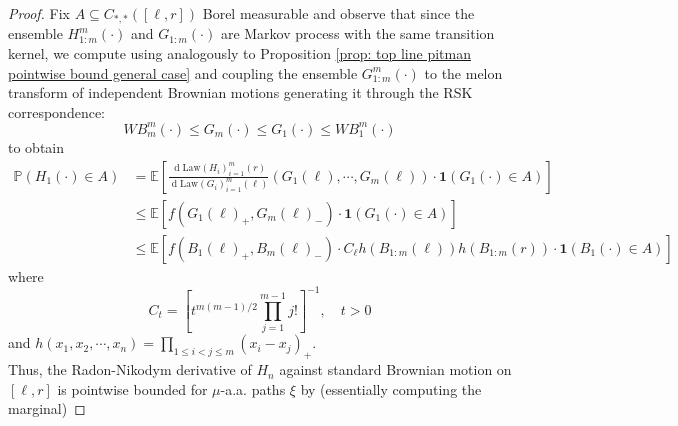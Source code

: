 \documentclass[11pt, reqno]{amsart}
\numberwithin{equation}{section}
\newcommand{\PP}{\ensuremath{\mathbb{P}}}
\newcommand{\diff}{\ensuremath{\operatorname{d}\!}}
\begin{document}
\begin{proof}
    Fix $A\subseteq C_{*,*}([\ell,r])$ Borel measurable and observe that since the ensemble $H_{1:m}^m(\cdot)$ and $G_{1:m}(\cdot)$ are Markov process with the same transition kernel, we compute using \cite[Theorem 7]{O2002representation} analogously to Proposition \ref{prop: top line pitman pointwise bound general case} and coupling the ensemble $G_{1:m}^m(\cdot)$ to the melon transform of independent Brownian motions generating it through the RSK correspondence:
    \[
    WB^m_m(\cdot) \le G_m(\cdot) \le G_1(\cdot) \le WB^m_1 (\cdot)
    \]
    to obtain
    \begin{equation*}
        \begin{array}{cc}
            \PP(H_1(\cdot)\in A) & =  \mathbb{E}\left[\frac{\diff \mathrm{Law}(H_i)_{i =1}^m(r)}{\diff\mathrm{Law}(G_i)_{i =1}^m(\ell)}(G_1(\ell), \cdots, G_m(\ell))\cdot\mathbf{1}(G_1(\cdot)\in A)\right]\\
            & \le  \mathbb{E}\left[f(G_1(\ell)_+, G_m(\ell)_-)\cdot\mathbf{1}(G_1(\cdot)\in A)\right]\\
            & \le  \mathbb{E}\left[f(B_1(\ell)_+, B_m(\ell)_-)\cdot C_\ell h(B_{1:m}(\ell))h(B_{1:m}(r))\cdot\mathbf{1}(B_1(\cdot)\in A)\right]
        \end{array}
    \end{equation*}
where
\begin{equation*}
    C_t = \left[t^{m(m-1)/2}\prod_{j=1}^{m-1}j!\right]^{-1}, \quad t> 0
\end{equation*}
and $h(x_1, x_2, \cdots, x_n) = \prod_{1\le i < j\le m}(x_i-x_j)_+$.\\
Thus, the Radon-Nikodym derivative of $H_n$ against standard Brownian motion on $[\ell,r]$ is pointwise bounded for $\mu$-a.a. paths $\xi$ by (essentially computing the marginal)


\end{proof}
\end{document}
